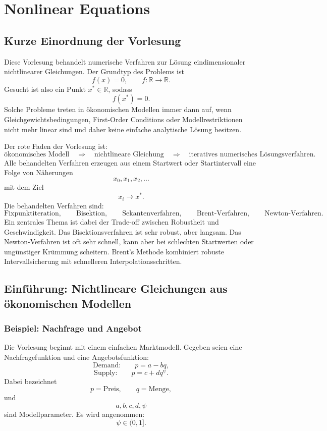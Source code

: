 \documentclass[10pt, letterpaper]{article}
\begin{document}
\section{Nonlinear Equations}

\subsection{Kurze Einordnung der Vorlesung}

Diese Vorlesung behandelt numerische Verfahren zur Lösung eindimensionaler nichtlinearer Gleichungen. Der Grundtyp des Problems ist
\[
f(x)=0,
\qquad
f:\mathbb{R}\to\mathbb{R}.
\]
Gesucht ist also ein Punkt \(x^\ast\in\mathbb{R}\), sodass
\[
f(x^\ast)=0.
\]
Solche Probleme treten in ökonomischen Modellen immer dann auf, wenn Gleichgewichtsbedingungen, First-Order Conditions oder Modellrestriktionen nicht mehr linear sind und daher keine einfache analytische Lösung besitzen.

Der rote Faden der Vorlesung ist:
\[
\text{ökonomisches Modell}
\quad\Longrightarrow\quad
\text{nichtlineare Gleichung}
\quad\Longrightarrow\quad
\text{iteratives numerisches Lösungsverfahren}.
\]
Alle behandelten Verfahren erzeugen aus einem Startwert oder Startintervall eine Folge von Näherungen
\[
x_0,x_1,x_2,\dots
\]
mit dem Ziel
\[
x_i\to x^\ast.
\]
Die behandelten Verfahren sind:
\[
\text{Fixpunktiteration},\qquad
\text{Bisektion},\qquad
\text{Sekantenverfahren},\qquad
\text{Brent-Verfahren},\qquad
\text{Newton-Verfahren}.
\]
Ein zentrales Thema ist dabei der Trade-off zwischen Robustheit und Geschwindigkeit. Das Bisektionsverfahren ist sehr robust, aber langsam. Das Newton-Verfahren ist oft sehr schnell, kann aber bei schlechten Startwerten oder ungünstiger Krümmung scheitern. Brent's Methode kombiniert robuste Intervallsicherung mit schnelleren Interpolationsschritten.

\subsection{Einführung: Nichtlineare Gleichungen aus ökonomischen Modellen}

\subsubsection{Beispiel: Nachfrage und Angebot}

Die Vorlesung beginnt mit einem einfachen Marktmodell. Gegeben seien eine Nachfragefunktion und eine Angebotsfunktion:
\[
\text{Demand:}\qquad p=a-bq,
\]
\[
\text{Supply:}\qquad p=c+dq^\psi.
\]
Dabei bezeichnet
\[
p=\text{Preis},\qquad q=\text{Menge},
\]
und
\[
a,b,c,d,\psi
\]
sind Modellparameter. Es wird angenommen:
\[
\psi\in(0,1].
\]
\end{document}
